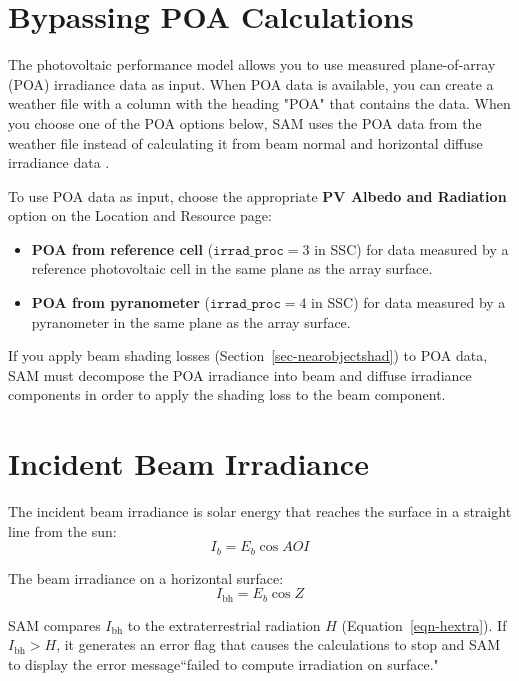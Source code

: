 \documentclass[12pt,letterpaper]{article}
\newcommand\AOI{\ensuremath{\mathit{AOI}}}
\begin{document}
\section{Bypassing POA Calculations}

The photovoltaic performance model allows you to use measured plane-of-array (POA) irradiance data as input. When POA data is available, you can create a weather file with a column with the heading "POA" that contains the data. When you choose one of the POA options below, SAM uses the POA data from the weather file instead of calculating it from  beam normal and horizontal diffuse irradiance data \citep{freeman2016}.

To use POA data as input, choose the appropriate \textbf{PV Albedo and Radiation} option on the Location and Resource page: 

\begin{itemize}
\item \textbf{POA from reference cell} ($\texttt{irrad\_proc}=3$ in SSC) for data measured by a reference photovoltaic cell in the same plane as the array surface.
\item \textbf{POA from pyranometer} ($\texttt{irrad\_proc}=4$ in SSC) for data measured by a pyranometer in the same plane as the array surface.
\end{itemize}

If you apply beam shading losses (Section~\ref{sec-nearobjectshad}) to POA data, SAM must decompose the POA irradiance into beam and diffuse irradiance components in order to apply the shading loss to the beam component. 

\section{Incident Beam Irradiance}\label{sec-incidentbeam}

The incident beam irradiance is solar energy that reaches the surface in a straight line from the sun:
\begin{equation}
I_b = E_b\cos\AOI
\end{equation}

The beam irradiance on a horizontal surface:
\begin{equation}\label{eqn-hbeam}
I_{\mathrm{bh}}=E_b\cos Z
\end{equation}

SAM compares $I_{\mathrm{bh}}$ to the extraterrestrial radiation $H$ (Equation~\ref{eqn-hextra}). If $I_{\mathrm{bh}}>H$, it generates an error flag that causes the calculations to stop and SAM to display the error message``failed to compute irradiation on surface."
\end{document}
